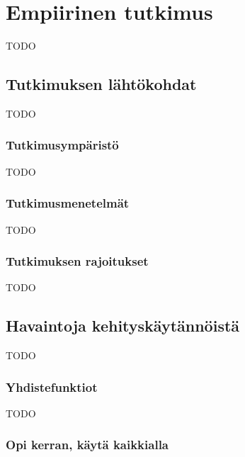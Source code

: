 \vspace{21.5pt}
\chapter{Empiirinen tutkimus}

TODO

\section{Tutkimuksen lähtökohdat}

TODO

\subsection{Tutkimusympäristö}

TODO

\subsection{Tutkimusmenetelmät}

TODO

\subsection{Tutkimuksen rajoitukset}


TODO
\section{Havaintoja kehityskäytännöistä}

TODO


\subsection{Yhdistefunktiot}

TODO

\subsection{Opi kerran, käytä kaikkialla}

